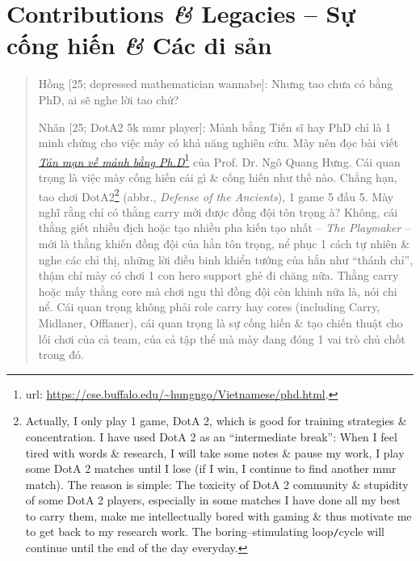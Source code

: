 \documentclass[12pt,oneside]{book}
\begin{document}

\section{Contributions {\it\&} Legacies -- Sự cống hiến {\it\&} Các di sản}

\begin{quote}
	{\sf Hồng [25; depressed mathematician wannabe]}: Nhưng tao chưa có bằng PhD, ai sẽ nghe lời tao chứ?
	
	{\sf Nhân [25; DotA2 5k mmr player]}: Mảnh bằng Tiến sĩ hay PhD chỉ là 1 minh chứng cho việc mày có khả năng nghiên cứu. Mày nên đọc bài viết \href{https://cse.buffalo.edu/~hungngo/Vietnamese/phd.html}{\it Tản mạn về mảnh bằng Ph.D}\footnote{{\sc url}: \url{https://cse.buffalo.edu/~hungngo/Vietnamese/phd.html}.} của Prof. Dr. {\sc Ngô Quang Hưng}. Cái quan trọng là việc mày cống hiến cái gì \& cống hiến như thế nào. Chẳng hạn, tao chơi DotA2\footnote{Actually, I only play 1 game, DotA 2, which is good for training strategies \& concentration. I have used DotA 2 as an ``intermediate break'': When I feel tired with words \& research, I will take some notes \& pause my work, I play some DotA 2 matches until I lose (if I win, I continue to find another {\sc mmr} match). The reason is simple: The toxicity of DotA 2 community \& stupidity of some DotA 2 players, especially in some matches I have done all my best to carry them, make me intellectually bored with gaming \& thus motivate me to get back to my research work. The boring--stimulating loop{\tt/}cycle will continue until the end of the day everyday.} (abbr., {\it Defense of the Ancients}), 1 game 5 đấu 5. Mày nghĩ rằng chỉ có thằng carry mới được đồng đội tôn trọng à? Không, cái thằng giết nhiều địch hoặc tạo nhiều pha kiến tạo nhất -- {\it The Playmaker} -- mới là thằng khiến đồng đội của hắn tôn trọng, nể phục 1 cách tự nhiên \& nghe các chỉ thị, những lời điều binh khiển tướng của hắn như ``thánh chỉ'', thậm chí mày có chơi 1 con hero support ghẻ đi chăng nữa. Thằng carry hoặc mấy thằng core mà chơi ngu thì đồng đội còn khinh nữa là, nói chi nể. Cái quan trọng không phải role carry hay cores (including Carry, Midlaner, Offlaner), cái quan trọng là sự cống hiến \& tạo chiến thuật cho lối chơi của cả team, của cả tập thể mà mày đang đóng 1 vai trò chủ chốt trong đó.
\end{quote}
\end{document}
